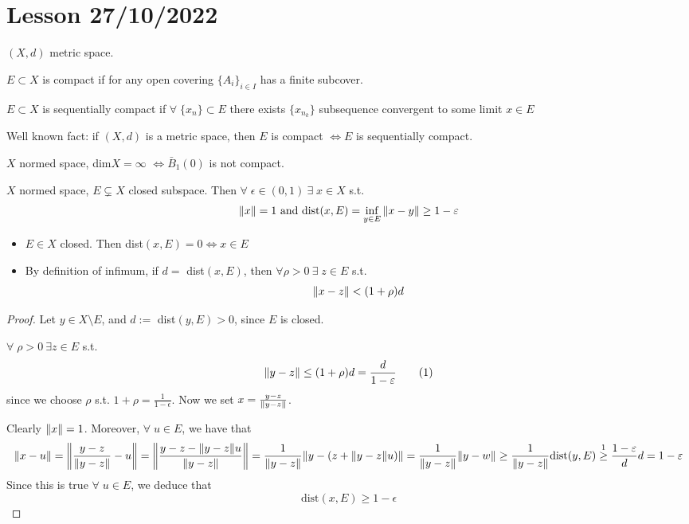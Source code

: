 \section{Lesson 27/10/2022}

\(\left(X, d\right)\) metric space.
\begin{definition}
    \(E \subset X\) is compact if for any open covering \(\{A_i\}_{i \in I}\) has a finite subcover.
\end{definition}

\begin{definition}
    \(E \subset X\) is sequentially compact if \(\forall \; \{x_n\} \subset E \) there exists \(\{x_{n_k}\}\) subsequence convergent to some limit \(x \in E\)
\end{definition}

Well known fact: if \(\left(X, d\right)\) is a metric space, then \(E\) is compact \(\iff E \) is sequentially compact.

\begin{theorem}[Riesz]
    \(X\) normed space, dim\(X = \infty\) \(\iff \bar{B}_1(0)\) is not compact. 
\end{theorem}

\begin{lemma}
    \(X\) normed space, \(E \subsetneq X\) closed subspace. Then \(\forall \; \epsilon \in \left(0, 1\right) \ \exists \; x \in X \) s.t. 
    \[
        \norm{x}=1 \text{ and } \text{dist}(x, E) = \inf_{y \in E} \norm{x-y} \geq 1- \varepsilon\]
\end{lemma}

\begin{remark}
    \begin{itemize}
        \item \(E \in X\) closed. Then dist\((x, E)=0 \iff x \in E\)
        \item By definition of infimum, if \(d =\) dist\((x, E)\), then \(\forall \rho >0 \ \exists \; z \in E\) s.t. 
        \[
            \norm{x-z} < (1+\rho) d
        \]
    \end{itemize}
\end{remark}

\begin{proof}
    Let \(y \in X \setminus E\), and \(d := \) dist\((y, E) >0\), since \(E\) is closed. 
    
    \(\forall \; \rho > 0 \ \exists z \in E \) s.t.
    \[
        \norm{y-z} \leq (1+\rho)d = \frac{d}{1-\varepsilon} \tag{1}
    \]
    since we choose \(\rho\) s.t. \(1+\rho = \frac{1}{1-\epsilon}\). Now we set \(x = \frac{y-z}{\norm{y-z}}\).

    Clearly \(\norm{x}=1\). Moreover, \(\forall \; u \in E\), we have that
    \[
        \norm{x-u} = \norm{ \frac{y-z}{\norm{y-z}} - u }
        = \norm{ \frac{y-z -\norm{y-z}u }{\norm{y-z}} }
        = \frac{1}{\norm{y-z}} \norm{y-(z + \norm{y-z}u)}
        = \frac{1}{\norm{y-z}} \norm{y-w}
        \geq \frac{1}{\norm{y-z}} \text{dist}(y, E)
        \overset{1}{\geq} \frac{1-\varepsilon}{d} d = 1 - \varepsilon
    \]
    Since this is true \(\forall \; u \in E\), we deduce that
    \[
        \text{dist}(x, E) \geq 1-\epsilon
    \]
\end{proof}


